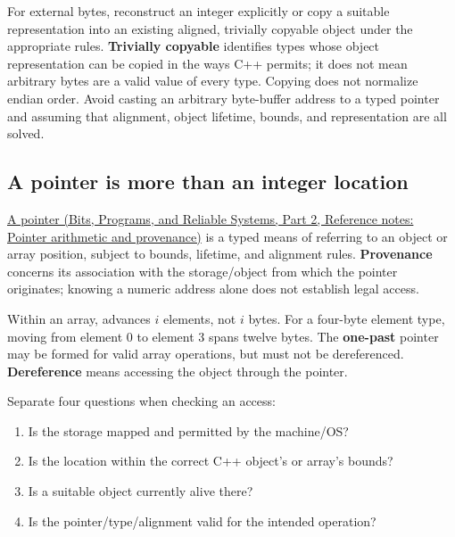 For external bytes, reconstruct an integer explicitly or copy a suitable representation into an existing aligned, trivially copyable object under the appropriate rules. \textbf{Trivially copyable} identifies types whose object representation can be copied in the ways C++ permits; it does not mean arbitrary bytes are a valid value of every type. Copying does not normalize endian order. Avoid casting an arbitrary byte-buffer address to a typed pointer and assuming that alignment, object lifetime, bounds, and representation are all solved.

\subsection{A pointer is more than an integer location}\label{05-engine-i-ch002-a-pointer-is-more-than-an-integer-location}

\hypertarget{05-engine-i-ch002-a-pointer-is-more-than-an-integer-location}{}

\href{../01-Bits-Programs-and-Reliable-Systems-P02/main.pdf\#appendix-6af5921bc853}{A pointer (Bits, Programs, and Reliable Systems, Part 2, Reference notes: Pointer arithmetic and provenance)} is a typed means of referring to an object or array position, subject to bounds, lifetime, and alignment rules. \textbf{Provenance} concerns its association with the storage/object from which the pointer originates; knowing a numeric address alone does not establish legal access.

Within an array,  advances \(i\) elements, not \(i\) bytes. For a four-byte element type, moving from element 0 to element 3 spans twelve bytes. The \textbf{one-past} pointer may be formed for valid array operations, but must not be dereferenced. \textbf{Dereference} means accessing the object through the pointer.

Separate four questions when checking an access:

\begin{enumerate}
\def\labelenumi{\arabic{enumi}.}
\tightlist
\item
  Is the storage mapped and permitted by the machine/OS?
\item
  Is the location within the correct C++ object's or array's bounds?
\item
  Is a suitable object currently alive there?
\item
  Is the pointer/type/alignment valid for the intended operation?
\end{enumerate}

